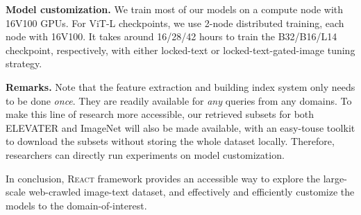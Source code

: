 \documentclass[10pt,twocolumn,letterpaper]{article}
\renewcommand{\paragraph}[1]{\vspace{1.25mm}\noindent\textbf{#1}}
\newcommand{\shortname}{\textsc{React}}
\begin{document}
\paragraph{Model customization.} We train most of our models on a compute node with 16V100 GPUs.  For ViT-L checkpoints, we use 2-node distributed training, each node with 16V100.  It takes around 16/28/42 hours to train the B32/B16/L14 checkpoint, respectively, with either locked-text or locked-text-gated-image tuning strategy.

\paragraph{Remarks.}  Note that the feature extraction and building index system only needs to be done \emph{once}.  They are readily available for \emph{any} queries from any domains.  To make this line of research more accessible, our retrieved subsets for both ELEVATER
and ImageNet will also be made available, with an easy-touse toolkit to download the subsets without storing the whole dataset locally. Therefore, researchers can directly run experiments on model customization.

In conclusion, \shortname{} framework provides an accessible way to explore the large-scale web-crawled image-text dataset, and effectively and efficiently customize the models to the domain-of-interest.   
\end{document}
